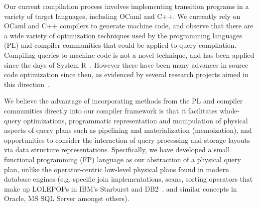 Our current compilation process involves implementing transition programs in a
variety of target languages, including OCaml and C++. We currently rely on OCaml
and C++ compilers to generate machine code, and observe that there are a wide
variety of optimization techniques used by the programming languages (PL) and
compiler communities that could be applied to query compilation. Compiling
queries to machine code is not a novel technique, and has been applied since the
days of System R~\cite{chamberlin-tods:81}. However there have been many
advances in source code optimization since then, as evidenced by several
research projects aimed in this
direction~\cite{arumugam-sigmod:10,krikellas-icde:10}.


We believe the advantage of incorporating methods from the PL and compiler
communities directly into our compiler framework is that it facilitates
whole-query optimizations, programmatic representation and manipulation of
physical aspects of query plans such as pipelining and materialization
(memoization), and opportunities to consider the interaction of query processing
and storage layouts via data structure representations.
Specifically, we have developed a small functional programming (FP) language as
our abstraction of a physical query plan, unlike the operator-centric low-level
physical plans found in modern database engines (e.g. specific join
implementations, scans, sorting operators that make up LOLEPOPs in IBM's
Starburst and DB2~\cite{mcpherson-debull:87}, and similar concepts in Oracle, MS
SQL Server amongst others).

